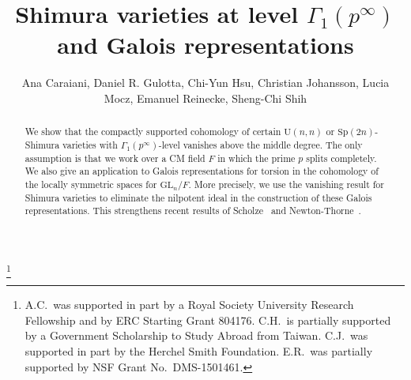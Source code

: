 \documentclass{amsart}
\theoremstyle{remark}
\numberwithin{equation}{subsection}
\renewcommand{\(}{\left(}
\renewcommand{\)}{\right)}
\begin{document}
\title{Shimura varieties at level $\Gamma_1(p^\infty)$ and Galois representations}
\author[A.~Caraiani, D.~Gulotta, C.~Hsu, C.~Johansson, L.~Mocz, E.~Reinecke, S.~Shih]{Ana Caraiani, Daniel R. Gulotta, Chi-Yun Hsu, Christian Johansson, Lucia Mocz, Emanuel Reinecke, Sheng-Chi Shih}
\address{Department of
  Mathematics, Imperial College London,
  London SW7 2AZ, UK}
\address{Department of Mathematics, Columbia University, 2990 Broadway, New York, NY 10027, USA}
\address{Department of Mathematics, Harvard University, 1 Oxford Street, Cambridge, MA 02138, USA}
\address{Department of Mathematical Sciences, Chalmers University of Technology and the University of Gothenburg,
  SE-412 96, Sweden}
\address{Mathematisches Institut der Universit\"at Bonn, Endenicher Allee 60, 53115 Bonn, Germany}
\address{Department of Mathematics, University of Michigan, Ann Arbor, MI 48109, USA}
\address{University of Lille, CNRS, UMR 8524 -- Laboratoire Paul Painlev\'e, 59000 Lille, France.}

\thanks{A.C.\ was supported in part by a Royal Society University Research Fellowship and by ERC Starting Grant 804176. C.H.\ is partially supported by a Government Scholarship to Study Abroad from Taiwan. C.J.\ was supported in part by the Herchel Smith Foundation. E.R.\ was partially supported by NSF Grant No.~DMS-1501461.}

\maketitle
\begin{abstract}
We show that the compactly supported cohomology of certain $\mathrm{U}(n,n)$ or $\mathrm{Sp}(2n)$-Shimura varieties with $\Gamma_1(p^\infty)$-level vanishes above the middle degree. The only assumption is that we work over a CM field $F$ in which the prime $p$ splits completely. We also give an application to Galois representations for torsion in the cohomology of the locally symmetric spaces for $\mathrm{GL}_n/F$. More precisely, we use the vanishing result for Shimura varieties to eliminate the nilpotent ideal in the construction of these Galois representations. This strengthens recent results of Scholze~\cite{scholze-galois} and Newton-Thorne~\cite{newton-thorne}. 
\end{abstract}
\end{document}
